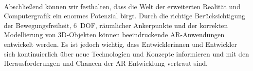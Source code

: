 \paragraph*{}
    Abschließend können wir festhalten, dass die Welt der erweiterten Realität und Computergrafik ein enormes Potenzial birgt.
    Durch die richtige Berücksichtigung der Bewegungsfreiheit, 6~DOF, räumlicher Ankerpunkte und der korrekten Modellierung von 3D-Objekten können beeindruckende AR-Anwendungen entwickelt werden.
    Es ist jedoch wichtig, dass Entwicklerinnen und Entwickler sich kontinuierlich über neue Technologien und Konzepte informieren und mit den Herausforderungen und Chancen der AR-Entwicklung vertraut sind.
